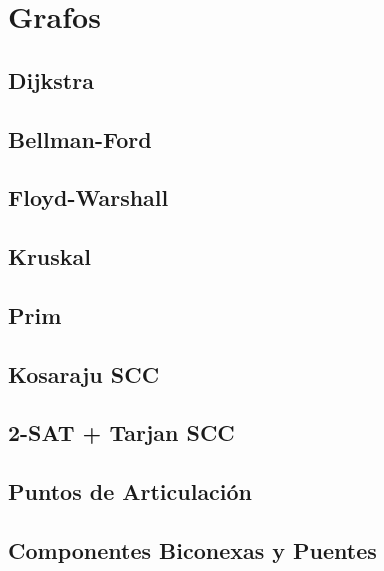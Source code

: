 \section{Grafos}

\subsection{Dijkstra}

\subsection{Bellman-Ford}

\subsection{Floyd-Warshall}


\subsection{Kruskal}

\subsection{Prim}


\subsection{Kosaraju SCC}

\subsection{2-SAT + Tarjan SCC}


\subsection{Puntos de Articulaci\'on}

\subsection{Componentes Biconexas y Puentes}


